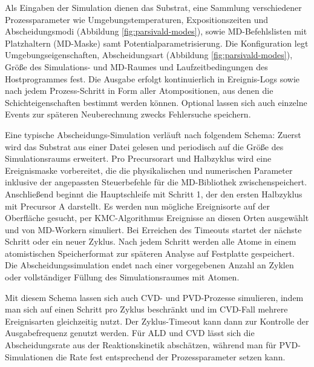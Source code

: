 Als Eingaben der Simulation dienen das Substrat, eine Sammlung verschiedener Prozessparameter wie Umgebungstemperaturen, Expositionszeiten und Abscheidungsmodi (Abbildung \ref{fig:parsivald-modes}), sowie MD-Befehlslisten mit Platzhaltern (MD-Maske) samt Potentialparametrisierung.
Die Konfiguration legt Umgebungseigenschaften, Abscheidungsart (Abbildung \ref{fig:parsivald-modes}), Größe des Simulations- und MD-Raumes und Laufzeitbedingungen des Hostprogrammes fest.
Die Ausgabe erfolgt kontinuierlich in Ereignis-Logs sowie nach jedem Prozess-Schritt in Form aller Atompositionen, aus denen die Schichteigenschaften bestimmt werden können.
Optional lassen sich auch einzelne Events zur späteren Neuberechnung zwecks Fehlersuche speichern.

Eine typische Abscheidungs-Simulation verläuft nach folgendem Schema:
Zuerst wird das Substrat aus einer Datei gelesen und periodisch auf die Größe des Simulationsraums erweitert.
Pro Precursorart und Halbzyklus wird eine Ereignismaske vorbereitet, die die physikalischen und numerischen Parameter inklusive der angepassten Steuerbefehle für die MD-Bibliothek zwischenspeichert.
Anschließend beginnt die Hauptschleife mit Schritt 1, der den ersten Halbzyklus mit Precursor A darstellt.
Es werden nun mögliche Ereignisorte auf der Oberfläche gesucht, per KMC-Algorithmus Ereignisse an diesen Orten ausgewählt und von MD-Workern simuliert.
Bei Erreichen des Timeouts startet der nächste Schritt oder ein neuer Zyklus.
Nach jedem Schritt werden alle Atome in einem atomistischen Speicherformat zur späteren Analyse auf Festplatte gespeichert.
Die Abscheidungssimulation endet nach einer vorgegebenen Anzahl an Zyklen oder vollständiger Füllung des Simulationsraumes mit Atomen.

Mit diesem Schema lassen sich auch CVD- und PVD-Prozesse simulieren, indem man sich auf einen Schritt pro Zyklus beschränkt und im CVD-Fall mehrere Ereignisarten gleichzeitig nutzt.
Der Zyklus-Timeout kann dann zur Kontrolle der Ausgabefrequenz genutzt werden.
Für ALD und CVD lässt sich die Abscheidungsrate aus der Reaktionskinetik abschätzen, während man für PVD-Simulationen die Rate fest entsprechend der Prozessparameter setzen kann.

